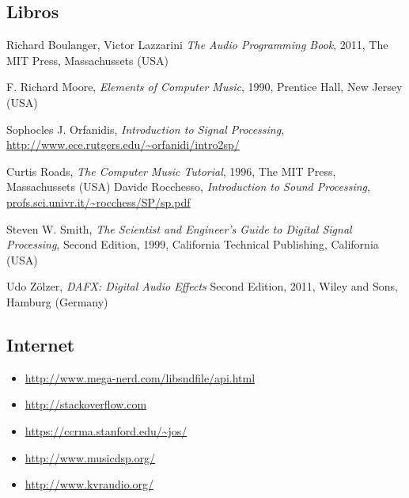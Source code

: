 \documentclass[a4paper,spanish,12pt]{article}
\begin{document}
\subsection{Libros}
\begin{thebibliography}{9}
  Richard Boulanger, Victor Lazzarini
  \emph{The Audio Programming Book},
  2011, The MIT Press, Massachussets (USA)
 
  F. Richard Moore,
  \emph{Elements of Computer Music},
  1990, Prentice Hall, New Jersey (USA)

  Sophocles J. Orfanidis,
  \emph{Introduction to Signal Processing}, \\
  \url{http://www.ece.rutgers.edu/~orfanidi/intro2sp/}
  
  Curtis Roads,
  \emph{The Computer Music Tutorial},
  1996, The MIT Press, Massachussets (USA)
  Davide Rocchesso,
  \emph{Introduction to Sound Processing},
  \url{profs.sci.univr.it/~rocchess/SP/sp.pdf}
  
  Steven W. Smith,
  \emph{The Scientist and Engineer's Guide to Digital Signal Processing},
  Second Edition, 1999, California Technical Publishing, California (USA)
  
  Udo Zölzer,
  \emph{DAFX: Digital Audio Effects}
  Second Edition, 2011, Wiley and Sons, Hamburg (Germany)
\end{thebibliography}
  
\subsection{Internet}

\begin{itemize}
\item \url{http://www.mega-nerd.com/libsndfile/api.html}
\item \url{http://stackoverflow.com}
\item \url{https://ccrma.stanford.edu/~jos/}
\item \url{http://www.musicdsp.org/}
\item \url{http://www.kvraudio.org/}
\end{itemize}
\end{document}

